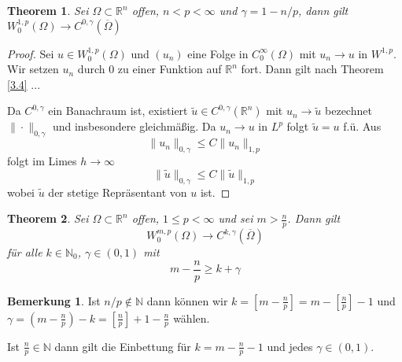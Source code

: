 \documentclass[
paper=a4,
bibtotocnumbered,
liststotocnumbered,
tablecaptionabove,
pointlessnumbers,
twoside,
openright,
10pt
]
{report}
\newtheorem{thm}{Theorem}[chapter]
\theoremstyle{definition}
\newtheorem*{rem}{Bemerkung}
\numberwithin{equation}{chapter}
\begin{document}
\begin{thm}\label{3.5}
	Sei $\Omega \subset \mathbb R^n$ offen, $n<p<\infty$ und $\gamma = 1- n/p$, dann gilt $W_0^{1,p}(\Omega) \to C^{0,\gamma}(\overline{\Omega})$
\end{thm}
\begin{proof}
	Sei $u\in W_0^{1,p}(\Omega)$ und $(u_n)$ eine Folge in $C_0^\infty(\Omega)$ mit $u_n \to u$ in $W^{1,p}$. Wir setzen $u_n$ durch $0$ zu einer Funktion auf $\mathbb R^n$ fort. Dann gilt nach Theorem \ref{3.4} ...

	Da $C^{0,\gamma}$ ein Banachraum ist, existiert $\tilde u \in C^{0,\gamma}(\mathbb R^n)$ mit $u_n\to \tilde u$ bezechnet $\| \cdot \|_{0,\gamma}$ und insbesondere gleichmäßig. Da $u_n \to u$ in $L^p$ folgt $\tilde u =u$ f.ü. Aus 
	\begin{equation}
		\|u_n\|_{0,\gamma} \le C \|u_n\|_{1,p}
	\end{equation}
folgt im Limes $h\to \infty$
	\begin{equation}
		\|\tilde u \|_{0,\gamma} \le C\| \tilde u\|_{1,p}
	\end{equation}
	wobei $\tilde u$ der stetige Repräsentant von $u$ ist.
\end{proof}
\begin{thm}
	Sei $\Omega \subset \mathbb R^n$ offen, $1\le p < \infty$ und sei $m>\frac{n}{p}$. Dann gilt
	\begin{equation}
	W_0^{m,p}(\Omega) \to C^{k, \gamma}(\overline{\Omega})
	\end{equation}
	für alle $k\in \mathbb N_0$, $\gamma \in (0,1)$ mit 
	\begin{equation}
	m-\frac{n}{p} \ge k + \gamma
\end{equation}
\end{thm}
\begin{rem}
Ist $n/p \not\in \mathbb N$ dann können wir $k=\left [m-\frac{n}{p}\right ] = m- \left [\frac{n}{p}\right ] -1$ und $\gamma = \left ( m- \frac{n}{p} \right )-k = \left [\frac{n}{p} \right ]+1 - \frac{n}{p}$ wählen.

Ist $\frac{n}{p}\in \mathbb N$ dann gilt die Einbettung für $k=m-\frac{n}{p}-1$ und jedes $\gamma \in (0,1)$.
\end{rem}
\end{document}
